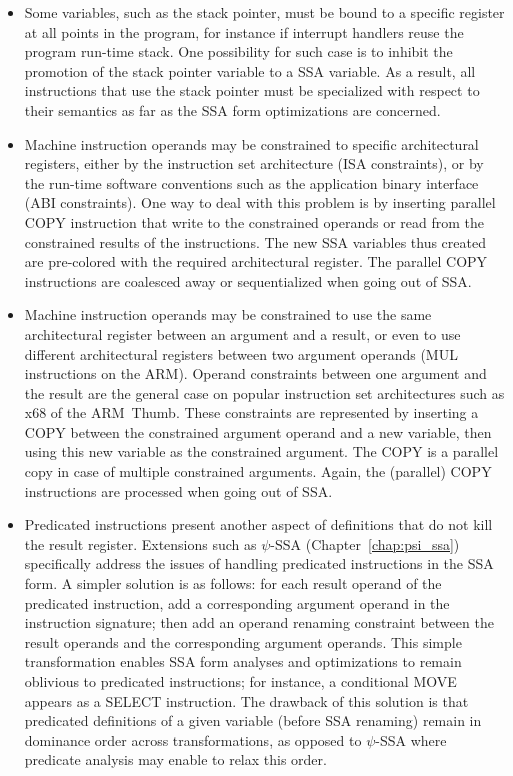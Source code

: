 \begin{itemize}
\item Some variables, such as the stack pointer, must be bound to a specific
register at all points in the program, for instance if interrupt handlers reuse
the program run-time stack. One possibility for such case is to inhibit the
promotion of the stack pointer variable to a SSA variable. As a result, all
instructions that use the stack pointer must be specialized with respect to
their semantics as far as the SSA form optimizations are concerned.

\item Machine instruction operands may be constrained to specific architectural
registers, either by the instruction set architecture (ISA constraints), or by
the run-time software conventions such as the application binary interface (ABI
constraints). One way to deal with this problem is by inserting parallel COPY
instruction that write to the constrained operands or read from the constrained
results of the instructions. The new SSA variables thus created are pre-colored
with the required architectural register. The parallel COPY instructions are
coalesced away or sequentialized when going out of SSA.

\item Machine instruction operands may be constrained to use the same
architectural register between an argument and a result, or even to use
different architectural registers between two argument operands (MUL
instructions on the ARM). Operand constraints between one argument and the
result are the general case on popular instruction set architectures such as
\textsf{x68} of the \textsf{ARM~Thumb}. These constraints are represented by
inserting a COPY between the constrained argument operand and a new variable,
then using this new variable as the constrained argument. The COPY is a parallel
copy in case of multiple constrained arguments. Again, the (parallel) COPY
instructions are processed when going out of SSA.

\item Predicated instructions present another aspect of definitions that do not
kill the result register. Extensions such as $\psi$-SSA
(Chapter~\ref{chap:psi_ssa}) specifically address the issues of handling
predicated instructions in the SSA form. A simpler solution is as follows: for
each result operand of the predicated instruction, add a corresponding argument
operand in the instruction signature; then add an operand renaming constraint
between the result operands and the corresponding argument operands. This simple
transformation enables SSA form analyses and optimizations to remain oblivious
to predicated instructions; for instance, a conditional MOVE appears as a SELECT
instruction. The drawback of this solution is that predicated definitions of a
given variable (before SSA renaming) remain in dominance order across
transformations, as opposed to $\psi$-SSA where predicate analysis may enable to
relax this order.

\end{itemize}


